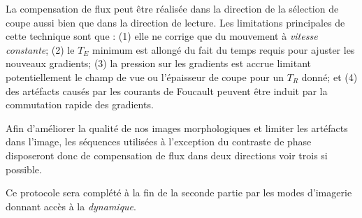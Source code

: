 La compensation de flux peut être réalisée dans la direction de la sélection de coupe aussi bien que dans la direction de lecture. Les limitations principales de cette technique sont que : (1) elle ne corrige que du mouvement à {\em vitesse constante}; (2) le $T_E$ minimum est allongé du fait du temps requis pour ajuster les nouveaux gradients; (3) la pression sur les gradients est accrue limitant potentiellement le champ de vue ou l'épaisseur de coupe pour un $T_R$ donné; et (4) des artéfacts causés par les courants de Foucault peuvent être induit par la commutation rapide des gradients.

Afin d'améliorer la qualité de nos images morphologiques et limiter les artéfacts dans l'image, les séquences utilisées à l'exception du contraste de phase disposeront donc de compensation de flux dans deux directions voir trois si possible.

Ce protocole sera complété à la fin de la seconde partie par les modes d’imagerie donnant accès à la {\em dynamique}.





			
		
{}
